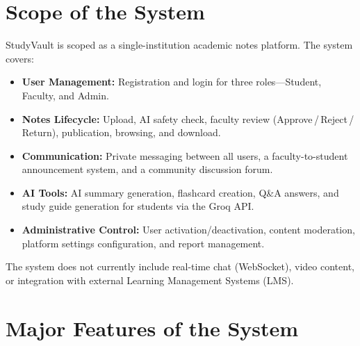 \documentclass{sgcproject}
\begin{document}
\section{Scope of the System}

StudyVault is scoped as a single-institution academic notes platform. The system covers:

\begin{itemize}
    \item \textbf{User Management:} Registration and login for three roles---Student, Faculty, and Admin.
    \item \textbf{Notes Lifecycle:} Upload, AI safety check, faculty review (Approve\,/\,Reject\,/\,Return), publication, browsing, and download.
    \item \textbf{Communication:} Private messaging between all users, a faculty-to-student announcement system, and a community discussion forum.
    \item \textbf{AI Tools:} AI summary generation, flashcard creation, Q\&A answers, and study guide generation for students via the Groq API.
    \item \textbf{Administrative Control:} User activation/deactivation, content moderation, platform settings configuration, and report management.
\end{itemize}

The system does not currently include real-time chat (WebSocket), video content, or integration with external Learning Management Systems (LMS).

\section{Major Features of the System}
\end{document}
